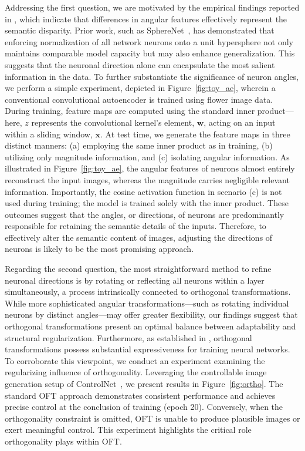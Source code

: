 Addressing the first question, we are motivated by the empirical findings reported in \cite{liu2018decoupled,chen2020angular}, which indicate that differences in angular features effectively represent the semantic disparity. Prior work, such as SphereNet~\cite{liu2017deep}, has demonstrated that enforcing normalization of all network neurons onto a unit hypersphere not only maintains comparable model capacity but may also enhance generalization. This suggests that the neuronal direction alone can encapsulate the most salient information in the data. To further substantiate the significance of neuron angles, we perform a simple experiment, depicted in Figure~\ref{fig:toy_ae}, wherein a conventional convolutional autoencoder is trained using flower image data. During training, feature maps are computed using the standard inner product—here, $z$ represents the convolutional kernel’s element, $\bm{w}$, acting on an input within a sliding window, $\bm{x}$. At test time, we generate the feature maps in three distinct manners: (a) employing the same inner product as in training, (b) utilizing only magnitude information, and (c) isolating angular information. As illustrated in Figure~\ref{fig:toy_ae}, the angular features of neurons almost entirely reconstruct the input images, whereas the magnitude carries negligible relevant information. Importantly, the cosine activation function in scenario (c) is not used during training; the model is trained solely with the inner product. These outcomes suggest that the angles, or directions, of neurons are predominantly responsible for retaining the semantic details of the inputs. Therefore, to effectively alter the semantic content of images, adjusting the directions of neurons is likely to be the most promising approach.

Regarding the second question, the most straightforward method to refine neuronal directions is by rotating or reflecting all neurons within a layer simultaneously, a process intrinsically connected to orthogonal transformations. While more sophisticated angular transformations—such as rotating individual neurons by distinct angles—may offer greater flexibility, our findings suggest that orthogonal transformations present an optimal balance between adaptability and structural regularization. Furthermore, as established in \cite{liu2021orthogonal}, orthogonal transformations possess substantial expressiveness for training neural networks. To corroborate this viewpoint, we conduct an experiment examining the regularizing influence of orthogonality. Leveraging the controllable image generation setup of ControlNet~\cite{zhang2023adding}, we present results in Figure~\ref{fig:ortho}. The standard OFT approach demonstrates consistent performance and achieves precise control at the conclusion of training (epoch 20). Conversely, when the orthogonality constraint is omitted, OFT is unable to produce plausible images or exert meaningful control. This experiment highlights the critical role orthogonality plays within OFT.

